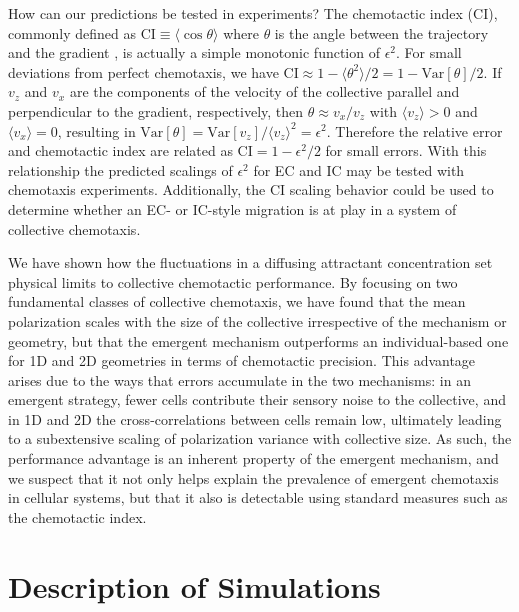 How can our predictions be tested in experiments? The chemotactic index (CI), commonly defined as
$\text{CI} \equiv \langle \cos\theta \rangle$ where $\theta$ is the angle between the trajectory and the gradient \cite{van2007biased}, is actually a simple monotonic function of $\epsilon^2$. For small deviations from perfect chemotaxis, we have
$\text{CI} \approx 1 - \langle \theta^2 \rangle/2 = 1 - \text{Var}[\theta]/2$.
If $v_z$ and $v_x$ are the components of the velocity of the collective parallel and perpendicular to the gradient, respectively, then $\theta \approx v_x/v_z$ with $\langle v_z\rangle > 0$ and $\langle v_x\rangle = 0$, resulting in
$\text{Var}[\theta] = \text{Var}[v_z] / \langle v_z\rangle^2 = \epsilon^2$.
Therefore the relative error and chemotactic index are related as
$\text{CI} = 1 - \epsilon^2/2$ for small errors.
With this relationship the predicted scalings of $\epsilon^2$ for EC and IC may be tested with chemotaxis experiments. Additionally, the
CI scaling behavior could be used to determine whether an EC- or IC-style migration is at play in a system of collective chemotaxis.

We have shown how the fluctuations in a diffusing attractant concentration set physical limits to collective chemotactic performance. By focusing on two fundamental classes of collective chemotaxis, we have found that the mean polarization scales with the size of the collective irrespective of the mechanism or geometry, but that the emergent mechanism outperforms an individual-based one for 1D and 2D geometries in terms of chemotactic precision.
This advantage arises due to the ways that errors accumulate in the two mechanisms: in an emergent strategy, fewer cells contribute their sensory noise to the collective, and in 1D and 2D the cross-correlations between cells remain low, ultimately leading to a subextensive scaling of polarization variance with collective size. As such, the performance advantage is an inherent property of the emergent mechanism, and we suspect that it not only helps explain the prevalence of emergent chemotaxis in cellular systems, but that it also is detectable using standard measures such as the chemotactic index.


\section{Description of Simulations} \label{sct:ch3_sim}

